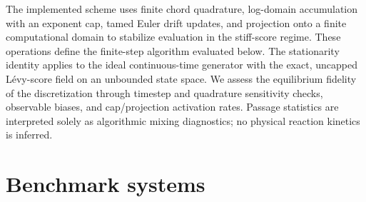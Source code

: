 \documentclass[11pt]{article}
\begin{document}
The implemented scheme uses finite chord quadrature, log-domain accumulation
with an exponent cap, tamed Euler drift updates, and projection onto a finite
computational domain to stabilize evaluation in the stiff-score regime.  These
operations define the finite-step algorithm evaluated below.  The stationarity
identity applies to the ideal continuous-time generator with the exact,
uncapped L\'evy-score field on an unbounded state space.  We assess the
equilibrium fidelity of the discretization through timestep and quadrature
sensitivity checks, observable biases, and cap/projection activation rates.
Passage statistics are interpreted solely as algorithmic mixing diagnostics;
no physical reaction kinetics is inferred.

\section{Benchmark systems}
\label{sec:systems}

\begin{table}[ht]
\centering
\small
\setlength{\tabcolsep}{5pt}
\caption{Reported numerical configurations and uncapped weak drift--jump
identity residuals (diagnostic tolerance $10^{-6}$;
Appendix~\ref{app:stability}).  The residual measures generator-level
drift--jump cancellation for a finite family of test functions.  Here $N$ is
the number of particles per seed block; a batched run with $S$ seeds evolves
$SN$ particles and computes metrics separately on each $N$-particle block.
Full model,
bank, and ladder specifications are
in Appendix~\ref{app:specs}.}
\label{tab:configs}
\end{table}
\end{document}
